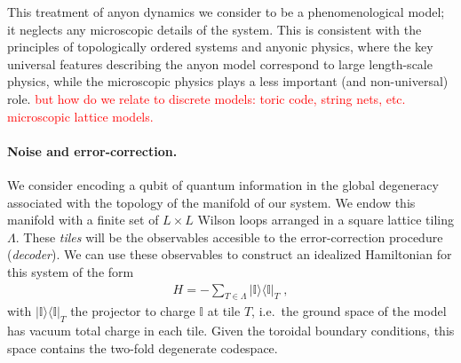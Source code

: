 \documentclass[aps, prl, letterpaper, twocolumn, superscriptaddress, notitlepage, 10pt]{revtex4}
\newcommand{\vac}{\mathbb{I}}
\newcommand{\ket}[1]{|{#1}\rangle}
\newcommand{\bra}[1]{\langle{#1}|}
\newcommand{\ketbra}[2]{\ket{#1}\!\bra{#2}}
\newcommand{\proj}[1]{\ketbra{#1}{#1}}
\newcommand{\dude}[1]{\textcolor{red}{#1}}
\begin{document}
This treatment of anyon dynamics we consider to be a phenomenological model;
it neglects any microscopic details of the system.
This is consistent with the principles of topologically 
ordered systems and anyonic physics, where the key universal features describing the 
anyon model correspond to large length-scale physics, while the microscopic physics plays 
a less important (and non-universal) role.
\dude{but how do we relate to discrete models: toric code, string nets, etc.
microscopic lattice models.}

\paragraph{Noise and error-correction.}


We consider encoding a qubit of quantum information in the global degeneracy associated 
with the topology of the manifold of our system.
We endow this manifold with a finite set of $L\times L$ Wilson loops arranged in
a square lattice tiling $\Lambda$.
These \emph{tiles} will be the observables accesible to the error-correction procedure (\emph{decoder}).
We can use these observables to construct an idealized Hamiltonian for this system of the form
\begin{align}
	H=-\sum_{T\in \Lambda}\proj{\vac}_T\;,\label{e:hamiltonian}
\end{align}
with $\proj{\vac}_T$ the projector to charge $\vac$ at tile $T$, i.e.~the ground 
space of the model has vacuum total charge in each tile.
Given the toroidal boundary 
conditions, this space contains the two-fold degenerate codespace.
\end{document}
